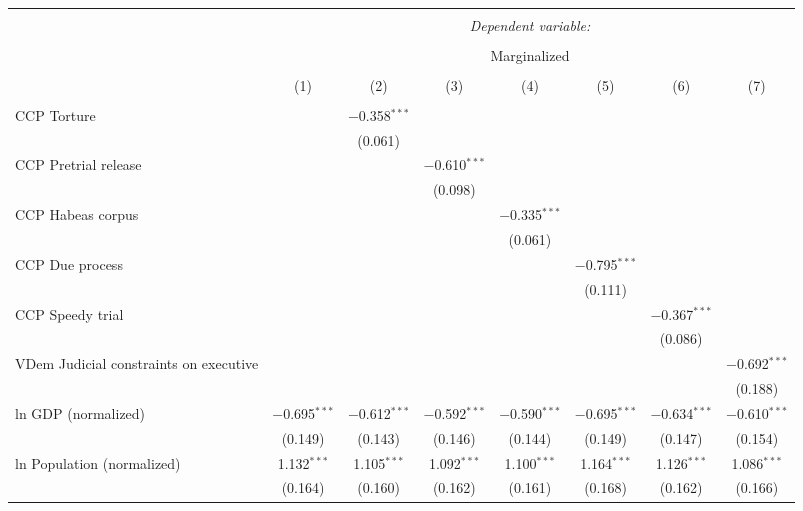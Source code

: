 
\begin{sidewaystable}[!htbp] \centering 
  \caption{} 
  \label{} 
\tiny 
\begin{tabular}{@{\extracolsep{5pt}}lccccccc} 
\\[-1.8ex]\hline 
\hline \\[-1.8ex] 
 & \multicolumn{7}{c}{\textit{Dependent variable:}} \\ 
\cline{2-8} 
\\[-1.8ex] & \multicolumn{7}{c}{Marginalized} \\ 
\\[-1.8ex] & (1) & (2) & (3) & (4) & (5) & (6) & (7)\\ 
\hline \\[-1.8ex] 
 CCP Torture &  & $-$0.358$^{***}$ &  &  &  &  &  \\ 
  &  & (0.061) &  &  &  &  &  \\ 
  CCP Pretrial release &  &  & $-$0.610$^{***}$ &  &  &  &  \\ 
  &  &  & (0.098) &  &  &  &  \\ 
  CCP Habeas corpus &  &  &  & $-$0.335$^{***}$ &  &  &  \\ 
  &  &  &  & (0.061) &  &  &  \\ 
  CCP Due process &  &  &  &  & $-$0.795$^{***}$ &  &  \\ 
  &  &  &  &  & (0.111) &  &  \\ 
  CCP Speedy trial &  &  &  &  &  & $-$0.367$^{***}$ &  \\ 
  &  &  &  &  &  & (0.086) &  \\ 
  VDem Judicial constraints on executive &  &  &  &  &  &  & $-$0.692$^{***}$ \\ 
  &  &  &  &  &  &  & (0.188) \\ 
  ln GDP (normalized) & $-$0.695$^{***}$ & $-$0.612$^{***}$ & $-$0.592$^{***}$ & $-$0.590$^{***}$ & $-$0.695$^{***}$ & $-$0.634$^{***}$ & $-$0.610$^{***}$ \\ 
  & (0.149) & (0.143) & (0.146) & (0.144) & (0.149) & (0.147) & (0.154) \\ 
  ln Population (normalized) & 1.132$^{***}$ & 1.105$^{***}$ & 1.092$^{***}$ & 1.100$^{***}$ & 1.164$^{***}$ & 1.126$^{***}$ & 1.086$^{***}$ \\ 
  & (0.164) & (0.160) & (0.162) & (0.161) & (0.168) & (0.162) & (0.166) \\ 

\end{tabular}
\end{sidewaystable}
